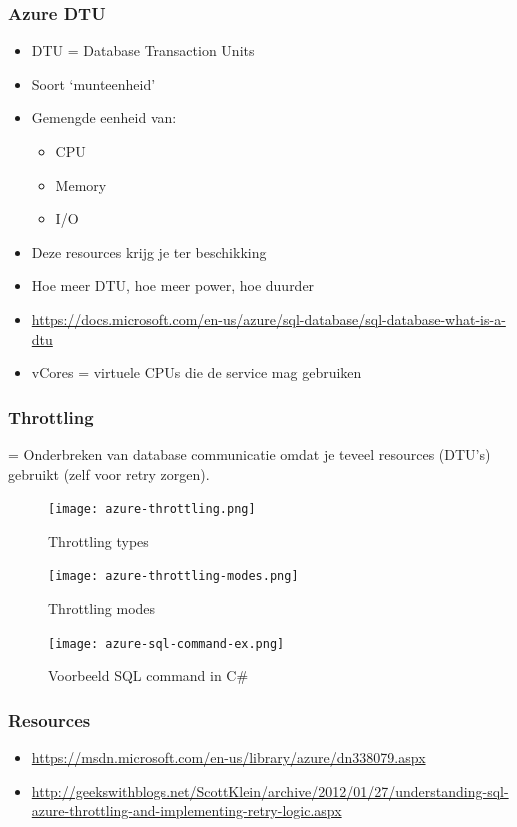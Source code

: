 \documentclass{article}
\begin{document}
\subsubsection{Azure DTU}
\begin{itemize}
    \item DTU = Database Transaction Units
    \item Soort `munteenheid'
    \item Gemengde eenheid van:
    \begin{itemize}
        \item CPU
        \item Memory
        \item I/O
    \end{itemize}
    \item Deze resources krijg je ter beschikking
    \item Hoe meer DTU, hoe meer power, hoe duurder
    \item \url{https://docs.microsoft.com/en-us/azure/sql-database/sql-database-what-is-a-dtu}
    \item vCores = virtuele CPUs die de service mag gebruiken
\end{itemize}

\subsubsection{Throttling}
= Onderbreken van database communicatie omdat je teveel resources (DTU's) gebruikt (zelf voor retry zorgen).

\begin{figure}[H]
    \centering
    \texttt{[image: azure-throttling.png]}
    \caption{Throttling types}
\end{figure}

\begin{figure}[H]
    \centering
    \texttt{[image: azure-throttling-modes.png]}
    \caption{Throttling modes}
\end{figure}

\begin{figure}[H]
    \centering
    \texttt{[image: azure-sql-command-ex.png]}
    \caption{Voorbeeld SQL command in C\#}
\end{figure}


\subsubsection{Resources}
\begin{itemize}
    \item \url{https://msdn.microsoft.com/en-us/library/azure/dn338079.aspx}
    \item \url{http://geekswithblogs.net/ScottKlein/archive/2012/01/27/understanding-sql-azure-throttling-and-implementing-retry-logic.aspx}
\end{itemize}
\end{document}
